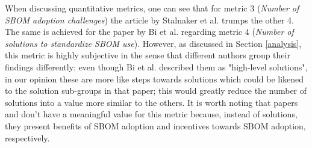 When discussing quantitative metrics, one can see that for metric 3 (\emph{Number of SBOM adoption challenges}) the article by Stalnaker et al. \cite{article:software-bom} trumps the other 4. The same is achieved for the paper by Bi et al. \cite{article:sboms-issues-solutions} regarding metric 4 (\emph{Number of solutions to standardize SBOM use}). However, as discussed in Section \ref{analysis}, this metric is highly subjective in the sense that different authors group their findings differently: even though Bi et al. described them as "high-level solutions", in our opinion these are more like steps towards solutions which could be likened to the solution sub-groups in that paper; this would greatly reduce the number of solutions into a value more similar to the others. It is worth noting that papers \cite{article:sbom-required} and \cite{article:business-sbom} don't have a meaningful value for this metric because, instead of solutions, they present benefits of SBOM adoption and incentives towards SBOM adoption, respectively.